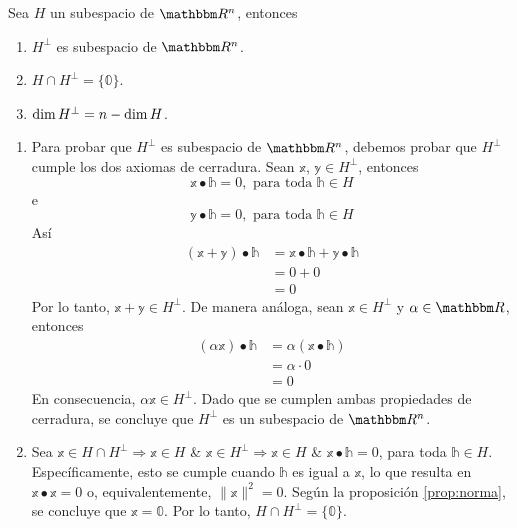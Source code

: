 \begin{theorem}\label{tres_teoremas_fuertes}
    Sea $H$ un subespacio de $\RR[n]$, entonces
    \begin{enumerate}[label=\roman*)]
        \item $H^{\bot}$ es subespacio de $\RR[n]$.
        \item $H \cap H^{\bot} = \{ \mathbb{0} \}$.
        \item $\operatorname{dim} H^{\bot} = n - \operatorname{dim} H$.
    \end{enumerate}
    \demostracion
    \begin{enumerate}[label=\roman*)]
        \item Para probar que $H^{\bot}$ es subespacio de $\RR[n]$, debemos probar que $H^{\bot}$ cumple los dos axiomas de cerradura. Sean $\mathbb{x}$, $\mathbb{y} \in H^{\bot}$, entonces
        $$\mathbb{x} \bullet \mathbb{h} = 0, \text{ para toda } \mathbb{h} \in H$$
        e
        $$\mathbb{y} \bullet \mathbb{h} = 0, \text{ para toda } \mathbb{h} \in H$$
        Así
        \begin{align*}
            (\mathbb{x} + \mathbb{y}) \bullet \mathbb{h} & = \mathbb{x} \bullet \mathbb{h} + \mathbb{y} \bullet \mathbb{h} \\
            & = 0 + 0 \\
            & = 0
        \end{align*}
        Por lo tanto, $\mathbb{x} + \mathbb{y} \in H^{\bot}$. De manera análoga, sean $\mathbb{x} \in H^{\bot}$ y $\alpha \in \RR$, entonces
        \begin{align*}
            (\alpha \mathbb{x}) \bullet \mathbb{h} & = \alpha (\mathbb{x} \bullet \mathbb{h}) \\
            & = \alpha \cdot 0 \\
            & = 0
        \end{align*}
        En consecuencia, $\alpha \mathbb{x} \in H^{\bot}$. Dado que se cumplen ambas propiedades de cerradura, se concluye que $H^{\bot}$ es un subespacio de $\RR[n]$.
        \item Sea $\mathbb{x} \in H \cap H^{\bot} \Longrightarrow \mathbb{x} \in H$ \& $\mathbb{x} \in H^{\bot} \Longrightarrow \mathbb{x} \in H$ \& $\mathbb{x} \bullet \mathbb{h} = 0$, para toda $\mathbb{h} \in H$. Específicamente, esto se cumple cuando $\mathbb{h}$ es igual a $\mathbb{x}$, lo que resulta en $\mathbb{x} \bullet \mathbb{x} = 0$ o, equivalentemente, $\| \mathbb{x} \|^2 = 0$. Según la proposición \ref{prop:norma}, se concluye que $\mathbb{x} = \mathbb{0}$. Por lo tanto, $H \cap H^{\bot} = \{ \mathbb{0} \}$.

\end{enumerate}
\end{theorem}
